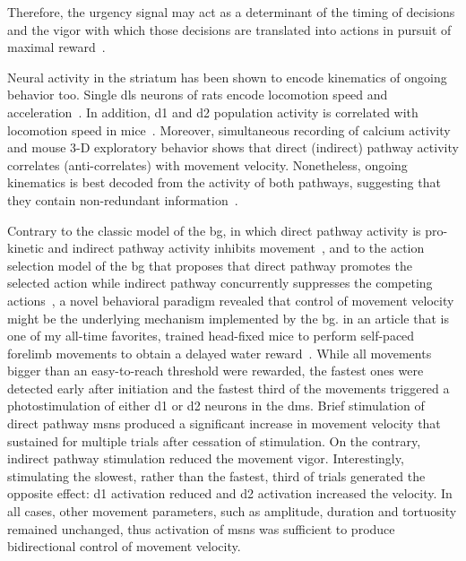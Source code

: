 Therefore, the urgency signal may act as a determinant of the timing of decisions and the vigor with which those decisions are translated into actions in pursuit of maximal reward~\cite{Carland2019NeuroSci}.
\par
Neural activity in the striatum has been shown to encode kinematics of ongoing behavior too.
Single \gls{dls} neurons of rats encode locomotion speed and acceleration~\cite{Rueda2015NN}.
In addition, \gls{d1} and \gls{d2} population activity is correlated with locomotion speed in mice~\cite{Barbera2016Neuron}.
Moreover, simultaneous recording of calcium activity and mouse 3-D exploratory behavior shows that direct (indirect) pathway activity correlates (anti-correlates) with movement velocity.
Nonetheless, ongoing kinematics is best decoded from the activity of both pathways, suggesting that they contain non-redundant information~\cite{Markowitz2018Cell}.
\par
Contrary to the classic model of the \gls{bg}, in which direct pathway activity is pro-kinetic and indirect pathway activity inhibits movement~\cite{Kravitz2010Nature}, and to the action selection model of the \gls{bg} that proposes that direct pathway promotes the selected action while indirect pathway concurrently suppresses the competing actions~\cite{Cui2013Nature}, a novel behavioral paradigm revealed that control of movement velocity might be the underlying mechanism implemented by the \gls{bg}.
 in an article that is one of my all-time favorites, trained head-fixed mice to perform self-paced forelimb movements to obtain a delayed water reward~\cite{Yttri2016Nature}.
While all movements bigger than an easy-to-reach threshold were rewarded, the fastest ones were detected early after initiation and the fastest third of the movements triggered a photostimulation of either \gls{d1} or \gls{d2} neurons in the \gls{dms}.
Brief stimulation of direct pathway \glspl{msn} produced a significant increase in movement velocity that sustained for multiple trials after cessation of stimulation.
On the contrary, indirect pathway stimulation reduced the movement vigor.
Interestingly, stimulating the slowest, rather than the fastest, third of trials generated the opposite effect:
\gls{d1} activation reduced and \gls{d2} activation increased the velocity.
In all cases, other movement parameters, such as amplitude, duration and tortuosity remained unchanged, thus activation of \glspl{msn} was sufficient to produce bidirectional control of movement velocity.
